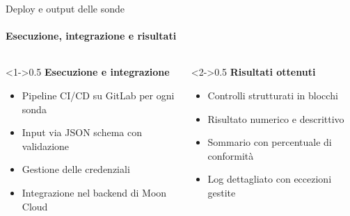 \documentclass{beamer}
\begin{document}
\begin{frame}{Deploy e output delle sonde}
    \framesubtitle{Esecuzione, integrazione e risultati}
    \begin{columns}
        \begin{column}<1->{0.5\textwidth}
            \textbf{Esecuzione e integrazione}
            \begin{itemize}
                \item Pipeline CI/CD su GitLab per ogni sonda
                \item Input via JSON schema con validazione
                \item Gestione delle credenziali
                \item Integrazione nel backend di Moon Cloud
            \end{itemize}
        \end{column}
        \begin{column}<2->{0.5\textwidth}
            \textbf{Risultati ottenuti}
            \begin{itemize}
                \item Controlli strutturati in blocchi
                \item Risultato numerico e descrittivo
                \item Sommario con percentuale di conformità
                \item Log dettagliato con eccezioni gestite
            \end{itemize}
        \end{column}
    \end{columns}
\end{frame}
\end{document}
